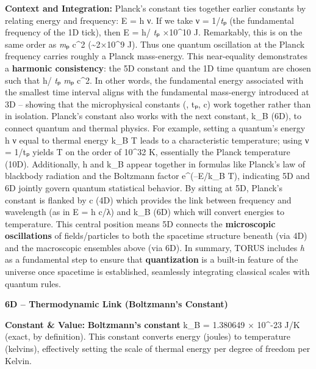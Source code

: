 \documentclass[
]{article}
\begin{document}
{\textbf{Context and Integration:} Planck's constant ties together
earlier constants by relating energy and frequency: E = h ν. If we take
ν = 1/\emph{t}ₚ (the fundamental frequency of the 1D tick), then E = h/
\emph{t}ₚ ×10\^{}10 J\hspace{0pt}. Remarkably, this is on the same
order as \emph{m}ₚ c\^{}2 (\textasciitilde2×10\^{}9 J)\hspace{0pt}. Thus
one quantum oscillation at the Planck frequency carries roughly a Planck
mass-energy. This near-equality demonstrates a \textbf{harmonic
consistency}: the 5D constant and the 1D time quantum are chosen such
that h/ \emph{t}ₚ \approx \emph{m}ₚ c\^{}2\hspace{0pt}. In other words, the
fundamental energy associated with the smallest time interval aligns
with the fundamental mass-energy introduced at 3D -- showing that the
microphysical constants (\hbar, tₚ, c) work together rather than in
isolation. Planck's constant also works with the next constant, k\_B
(6D), to connect quantum and thermal physics. For example, setting a
quantum's energy h ν equal to thermal energy k\_B T leads to a
characteristic temperature; using ν = 1/tₚ yields T on the order of
10\^{}32 K, essentially the Planck temperature (10D)\hspace{0pt}.
Additionally, h and k\_B appear together in formulas like Planck's law
of blackbody radiation and the Boltzmann factor e\^{}(--E/k\_B T),
indicating 5D and 6D jointly govern quantum statistical behavior. By
sitting at 5D, Planck's constant is flanked by c (4D) which provides the
link between frequency and wavelength (as in E = h c/λ) and k\_B (6D)
which will convert energies to temperature\hspace{0pt}. This central
position means 5D connects the \textbf{microscopic oscillations} of
fields/particles to both the spacetime structure beneath (via 4D) and
the macroscopic ensembles above (via 6D). In summary, TORUS includes
\emph{h} as a fundamental step to ensure that \textbf{quantization} is a
built-in feature of the universe once spacetime is established,
seamlessly integrating classical scales with quantum rules.

\textbf{6D -- Thermodynamic Link (Boltzmann's Constant)}

\textbf{Constant \& Value:} \textbf{Boltzmann's constant} k\_B =
1.380649 × 10\^{}-23 J/K (exact, by definition)\hspace{0pt}. This
constant converts energy (joules) to temperature (kelvins), effectively
setting the scale of thermal energy per degree of freedom per Kelvin.

}
\end{document}
